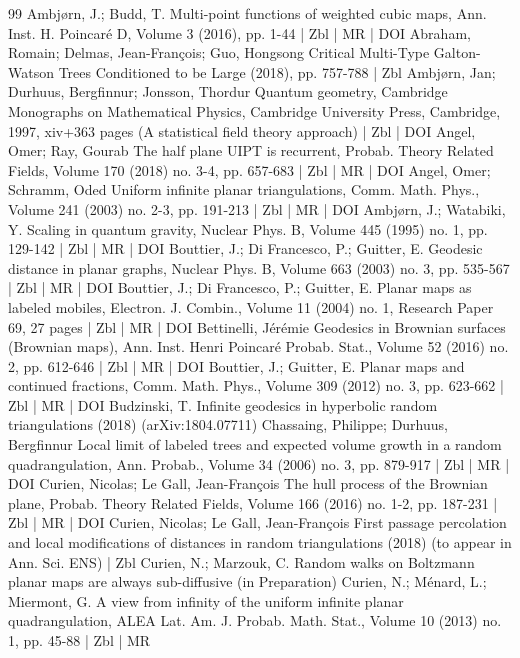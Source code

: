 \begin{thebibliography}{99}
Ambjørn, J.; Budd, T. Multi-point functions of weighted cubic maps, Ann. Inst. H. Poincaré D, Volume 3 (2016), pp. 1-44 | Zbl | MR | DOI
Abraham, Romain; Delmas, Jean-François; Guo, Hongsong Critical Multi-Type Galton-Watson Trees Conditioned to be Large (2018), pp. 757-788 | Zbl
Ambjørn, Jan; Durhuus, Bergfinnur; Jonsson, Thordur Quantum geometry, Cambridge Monographs on Mathematical Physics, Cambridge University Press, Cambridge, 1997, xiv+363 pages (A statistical field theory approach) | Zbl | DOI
Angel, Omer; Ray, Gourab The half plane UIPT is recurrent, Probab. Theory Related Fields, Volume 170 (2018) no. 3-4, pp. 657-683 | Zbl | MR | DOI
Angel, Omer; Schramm, Oded Uniform infinite planar triangulations, Comm. Math. Phys., Volume 241 (2003) no. 2-3, pp. 191-213 | Zbl | MR | DOI
Ambjørn, J.; Watabiki, Y. Scaling in quantum gravity, Nuclear Phys. B, Volume 445 (1995) no. 1, pp. 129-142 | Zbl | MR | DOI
Bouttier, J.; Di Francesco, P.; Guitter, E. Geodesic distance in planar graphs, Nuclear Phys. B, Volume 663 (2003) no. 3, pp. 535-567 | Zbl | MR | DOI
Bouttier, J.; Di Francesco, P.; Guitter, E. Planar maps as labeled mobiles, Electron. J. Combin., Volume 11 (2004) no. 1, Research Paper 69, 27 pages | Zbl | MR | DOI
Bettinelli, Jérémie Geodesics in Brownian surfaces (Brownian maps), Ann. Inst. Henri Poincaré Probab. Stat., Volume 52 (2016) no. 2, pp. 612-646 | Zbl | MR | DOI
Bouttier, J.; Guitter, E. Planar maps and continued fractions, Comm. Math. Phys., Volume 309 (2012) no. 3, pp. 623-662 | Zbl | MR | DOI
Budzinski, T. Infinite geodesics in hyperbolic random triangulations (2018) (arXiv:1804.07711)
Chassaing, Philippe; Durhuus, Bergfinnur Local limit of labeled trees and expected volume growth in a random quadrangulation, Ann. Probab., Volume 34 (2006) no. 3, pp. 879-917 | Zbl | MR | DOI
Curien, Nicolas; Le Gall, Jean-François The hull process of the Brownian plane, Probab. Theory Related Fields, Volume 166 (2016) no. 1-2, pp. 187-231 | Zbl | MR | DOI
Curien, Nicolas; Le Gall, Jean-François First passage percolation and local modifications of distances in random triangulations (2018) (to appear in Ann. Sci. ENS) | Zbl
Curien, N.; Marzouk, C. Random walks on Boltzmann planar maps are always sub-diffusive (in Preparation)
Curien, N.; Ménard, L.; Miermont, G. A view from infinity of the uniform infinite planar quadrangulation, ALEA Lat. Am. J. Probab. Math. Stat., Volume 10 (2013) no. 1, pp. 45-88 | Zbl | MR

\end{thebibliography}
